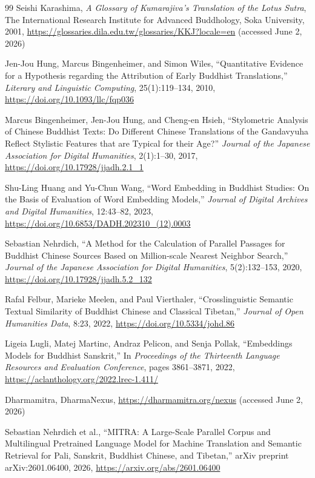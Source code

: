 \documentclass[uplatex,dvipdfmx,11pt,a4paper]{jsarticle}
\begin{document}
\begin{thebibliography}{99}
Seishi Karashima,
\newblock \textit{A Glossary of Kumarajiva's Translation of the Lotus Sutra},
\newblock The International Research Institute for Advanced Buddhology, Soka University, 2001,
\newblock \url{https://glossaries.dila.edu.tw/glossaries/KKJ?locale=en} (accessed June 2, 2026)

Jen-Jou Hung, Marcus Bingenheimer, and Simon Wiles,
\newblock ``Quantitative Evidence for a Hypothesis regarding the Attribution of Early Buddhist Translations,''
\newblock \textit{Literary and Linguistic Computing}, 25(1):119--134, 2010,
\newblock \url{https://doi.org/10.1093/llc/fqp036}

Marcus Bingenheimer, Jen-Jou Hung, and Cheng-en Hsieh,
\newblock ``Stylometric Analysis of Chinese Buddhist Texts: Do Different Chinese Translations of the Gandavyuha Reflect Stylistic Features that are Typical for their Age?''
\newblock \textit{Journal of the Japanese Association for Digital Humanities}, 2(1):1--30, 2017,
\newblock \url{https://doi.org/10.17928/jjadh.2.1_1}

Shu-Ling Huang and Yu-Chun Wang,
\newblock ``Word Embedding in Buddhist Studies: On the Basis of Evaluation of Word Embedding Models,''
\newblock \textit{Journal of Digital Archives and Digital Humanities}, 12:43--82, 2023,
\newblock \url{https://doi.org/10.6853/DADH.202310_(12).0003}

Sebastian Nehrdich,
\newblock ``A Method for the Calculation of Parallel Passages for Buddhist Chinese Sources Based on Million-scale Nearest Neighbor Search,''
\newblock \textit{Journal of the Japanese Association for Digital Humanities}, 5(2):132--153, 2020,
\newblock \url{https://doi.org/10.17928/jjadh.5.2_132}

Rafal Felbur, Marieke Meelen, and Paul Vierthaler,
\newblock ``Crosslinguistic Semantic Textual Similarity of Buddhist Chinese and Classical Tibetan,''
\newblock \textit{Journal of Open Humanities Data}, 8:23, 2022,
\newblock \url{https://doi.org/10.5334/johd.86}

Ligeia Lugli, Matej Martinc, Andraz Pelicon, and Senja Pollak,
\newblock ``Embeddings Models for Buddhist Sanskrit,''
\newblock In \textit{Proceedings of the Thirteenth Language Resources and Evaluation Conference}, pages 3861--3871, 2022,
\newblock \url{https://aclanthology.org/2022.lrec-1.411/}

Dharmamitra,
\newblock DharmaNexus,
\newblock \url{https://dharmamitra.org/nexus} (accessed June 2, 2026)

Sebastian Nehrdich et al.,
\newblock ``MITRA: A Large-Scale Parallel Corpus and Multilingual Pretrained Language Model for Machine Translation and Semantic Retrieval for Pali, Sanskrit, Buddhist Chinese, and Tibetan,''
\newblock arXiv preprint arXiv:2601.06400, 2026,
\newblock \url{https://arxiv.org/abs/2601.06400}

\end{thebibliography}
\end{document}
